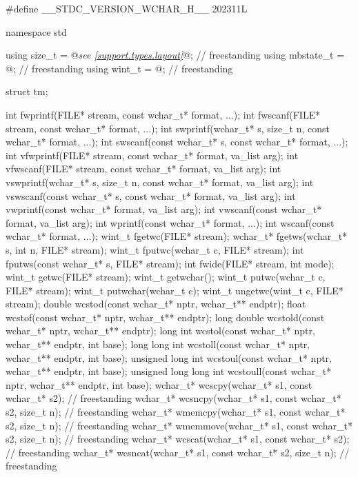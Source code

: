 \begin{codeblock}
#define __STDC_VERSION_WCHAR_H__ 202311L

namespace std {
  using size_t = @\textit{see \ref{support.types.layout}}@;                                             // freestanding
  using mbstate_t = @\seebelow@;                                          // freestanding
  using wint_t = @\seebelow@;                                             // freestanding

  struct tm;

  int fwprintf(FILE* stream, const wchar_t* format, ...);
  int fwscanf(FILE* stream, const wchar_t* format, ...);
  int swprintf(wchar_t* s, size_t n, const wchar_t* format, ...);
  int swscanf(const wchar_t* s, const wchar_t* format, ...);
  int vfwprintf(FILE* stream, const wchar_t* format, va_list arg);
  int vfwscanf(FILE* stream, const wchar_t* format, va_list arg);
  int vswprintf(wchar_t* s, size_t n, const wchar_t* format, va_list arg);
  int vswscanf(const wchar_t* s, const wchar_t* format, va_list arg);
  int vwprintf(const wchar_t* format, va_list arg);
  int vwscanf(const wchar_t* format, va_list arg);
  int wprintf(const wchar_t* format, ...);
  int wscanf(const wchar_t* format, ...);
  wint_t fgetwc(FILE* stream);
  wchar_t* fgetws(wchar_t* s, int n, FILE* stream);
  wint_t fputwc(wchar_t c, FILE* stream);
  int fputws(const wchar_t* s, FILE* stream);
  int fwide(FILE* stream, int mode);
  wint_t getwc(FILE* stream);
  wint_t getwchar();
  wint_t putwc(wchar_t c, FILE* stream);
  wint_t putwchar(wchar_t c);
  wint_t ungetwc(wint_t c, FILE* stream);
  double wcstod(const wchar_t* nptr, wchar_t** endptr);
  float wcstof(const wchar_t* nptr, wchar_t** endptr);
  long double wcstold(const wchar_t* nptr, wchar_t** endptr);
  long int wcstol(const wchar_t* nptr, wchar_t** endptr, int base);
  long long int wcstoll(const wchar_t* nptr, wchar_t** endptr, int base);
  unsigned long int wcstoul(const wchar_t* nptr, wchar_t** endptr, int base);
  unsigned long long int wcstoull(const wchar_t* nptr, wchar_t** endptr, int base);
  wchar_t* wcscpy(wchar_t* s1, const wchar_t* s2);                      // freestanding
  wchar_t* wcsncpy(wchar_t* s1, const wchar_t* s2, size_t n);           // freestanding
  wchar_t* wmemcpy(wchar_t* s1, const wchar_t* s2, size_t n);           // freestanding
  wchar_t* wmemmove(wchar_t* s1, const wchar_t* s2, size_t n);          // freestanding
  wchar_t* wcscat(wchar_t* s1, const wchar_t* s2);                      // freestanding
  wchar_t* wcsncat(wchar_t* s1, const wchar_t* s2, size_t n);           // freestanding
}
\end{codeblock}
